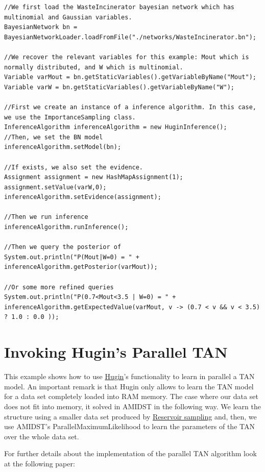 \begin{lstlisting}
//We first load the WasteIncinerator bayesian network which has multinomial and Gaussian variables.
BayesianNetwork bn = BayesianNetworkLoader.loadFromFile("./networks/WasteIncinerator.bn");

//We recover the relevant variables for this example: Mout which is normally distributed, and W which is multinomial.
Variable varMout = bn.getStaticVariables().getVariableByName("Mout");
Variable varW = bn.getStaticVariables().getVariableByName("W");

//First we create an instance of a inference algorithm. In this case, we use the ImportanceSampling class.
InferenceAlgorithm inferenceAlgorithm = new HuginInference();
//Then, we set the BN model
inferenceAlgorithm.setModel(bn);

//If exists, we also set the evidence.
Assignment assignment = new HashMapAssignment(1);
assignment.setValue(varW,0);
inferenceAlgorithm.setEvidence(assignment);

//Then we run inference
inferenceAlgorithm.runInference();

//Then we query the posterior of
System.out.println("P(Mout|W=0) = " + inferenceAlgorithm.getPosterior(varMout));

//Or some more refined queries
System.out.println("P(0.7<Mout<3.5 | W=0) = " + inferenceAlgorithm.getExpectedValue(varMout, v -> (0.7 < v && v < 3.5) ? 1.0 : 0.0 ));

\end{lstlisting}


\section{Invoking Hugin's Parallel TAN}

This example shows how to use \href{https://www.hugin.com}{Hugin}'s functionality to learn in parallel a TAN model. An important remark is that Hugin only allows to learn the TAN model for a data set completely loaded into RAM memory. The case where our data set does not fit into memory, it solved in AMIDST in the following way. We learn the structure using a smaller data set produced by \href{https://en.wikipedia.org/wiki/Reservoir_sampling}{Reservoir sampling} and, then, we use AMIDST's ParallelMaximumLikelihood to learn the parameters of the TAN over the whole data set.

For further details about the implementation of the parallel TAN algorithm look at the following paper:

